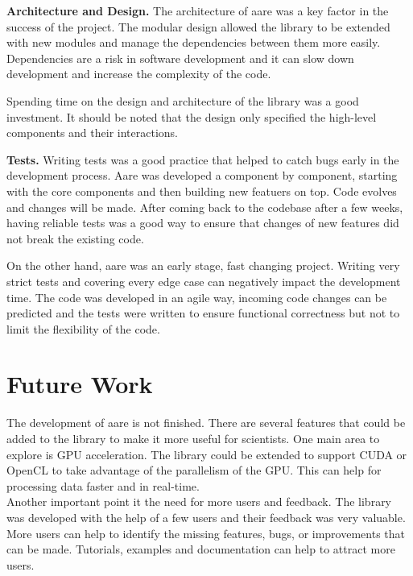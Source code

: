 \begin{spacing}{1.2}
\textbf{Architecture and Design.} The architecture of aare was a key factor in the success of the project.
The modular design allowed the library to be extended with new modules and manage 
the dependencies between them more easily. Dependencies are a risk in software development
and it can slow down development and increase the complexity of the code. 

Spending time on the design and architecture of the library was a good investment. It should be 
noted that the design only specified the high-level components and their interactions. 

\textbf{Tests.} Writing tests was a good practice that helped to catch bugs early in the
development process. Aare was developed a component by component, starting with the core components
and then building new featuers on top. Code evolves and changes will be made. After coming 
back to the codebase after a few weeks, having reliable tests was a good way to ensure that
changes of new features did not break the existing code.

On the other hand, aare was an early stage, fast changing project. Writing very strict 
tests and covering every edge case can negatively impact the development time.
The code was developed in an agile way, incoming code changes can be predicted and the tests
were written to ensure functional correctness but not to limit the flexibility of the code.

\section*{Future Work}
The development of aare is not finished. There are several features that could be added
to the library to make it more useful for scientists. One main area to explore is GPU 
acceleration. The library could be extended to support CUDA or OpenCL to take advantage
of the parallelism of the GPU. This can help for processing data faster and in real-time.\\

Another important point it the need for more users and feedback. The library was developed
with the help of a few users and their feedback was very valuable. More users can help to
identify the missing features, bugs, or improvements that can be made. Tutorials, examples 
and documentation can help to attract more users.\\



\end{spacing}